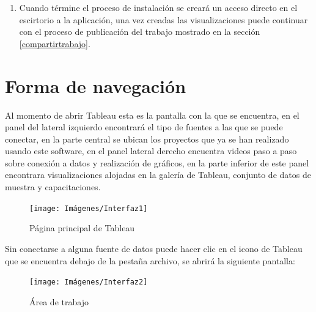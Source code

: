 \documentclass[
]{book}
\providecommand{\tightlist}{%
  \setlength{\itemsep}{0pt}\setlength{\parskip}{0pt}}
\begin{document}
\begin{enumerate}
\def\labelenumi{\arabic{enumi}.}
\setcounter{enumi}{2}
\tightlist
\item
  Cuando términe el proceso de instalación se creará un acceso directo en el escirtorio a la aplicación, una vez creadas las visualizaciones puede continuar con el proceso de publicación del trabajo mostrado en la sección \ref{compartirtrabajo}.
\end{enumerate}

\hypertarget{formadenavegacion}{%
\section{Forma de navegación}\label{formadenavegacion}}

Al momento de abrir Tableau esta es la pantalla con la que se encuentra, en el panel del lateral izquierdo encontrará el tipo de fuentes a las que se puede conectar, en la parte central se ubican los proyectos que ya se han realizado usando este software, en el panel lateral derecho encuentra videos paso a paso sobre conexión a datos y realización de gráficos, en la parte inferior de este panel encontrara visualizaciones alojadas en la galería de Tableau, conjunto de datos de muestra y capacitaciones.

\begin{figure}

{\centering \texttt{[image: Imágenes/Interfaz1]} 

}

\caption{Página principal de Tableau}\label{fig:paginaprincipal-fig}
\end{figure}

Sin conectarse a alguna fuente de datos puede hacer clic en el icono de Tableau que se encuentra debajo de la pestaña archivo, se abrirá la siguiente pantalla:

\begin{figure}

{\centering \texttt{[image: Imágenes/Interfaz2]} 

}

\caption{Área de trabajo}\label{fig:ventanacreacion-fig}
\end{figure}
\end{document}
